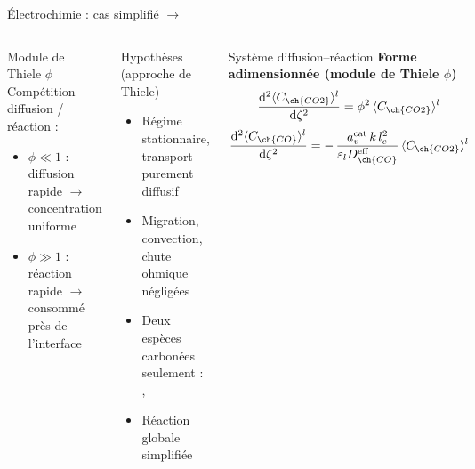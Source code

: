 \begin{frame}[t]{Électrochimie : cas simplifié  $\rightarrow$ }
  \vspace{-1em}

  \begin{columns}[T,onlytextwidth]

\vspace{-0.5em}

   \begin{pcbanner}{Module de Thiele $\phi$}
        \footnotesize
        Compétition diffusion / réaction :
        \begin{itemize}\footnotesize
        \item $\phi \ll 1$ : diffusion rapide $\rightarrow$ concentration uniforme
        \item $\phi \gg 1$ : réaction rapide $\rightarrow$  consommé près de l'interface
        \end{itemize}
      \end{pcbanner}

      \begin{pcbanner}{Hypothèses (approche de Thiele)}
        \vspace{0.15em}
        \begin{itemize}\footnotesize
          \item Régime stationnaire, transport purement diffusif
          \item Migration, convection, chute ohmique négligées
          \item Deux espèces carbonées seulement : , 
          \item Réaction globale simplifiée 
        \end{itemize}
      \end{pcbanner}

      \vspace{-0.5em}
      \begin{pcbanner}{Système diffusion--réaction}
        \centering\scriptsize
       \textbf{Forme adimensionnée (module de Thiele $\phi$)}
        \[ \frac{\mathrm{d}^2 \langle C_{\ch{CO2}}\rangle^l}{\mathrm{d}\zeta^2}
           = \phi^2\, \langle C_{\ch{CO2}}\rangle^l \]
        \[ \frac{\mathrm{d}^2 \langle C_{\ch{CO}}\rangle^l}{\mathrm{d}\zeta^2}
           = -\,\frac{a_v^{\mathrm{cat}}\, k\, l_e^2}{\varepsilon_l D^{\mathrm{eff}}_{\ch{CO}}}
             \, \langle C_{\ch{CO2}}\rangle^l \]
      \end{pcbanner}


\end{columns}
\end{frame}

